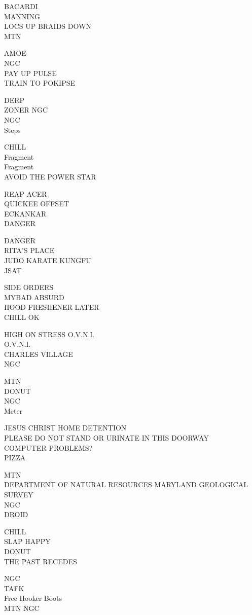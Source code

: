\documentclass[10pt,letterpaper]{article}
\begin{document}
BACARDI\\
MANNING\\
LOCS UP BRAIDS DOWN\\
MTN

AMOE\\
NGC\\
PAY UP PULSE\\
TRAIN TO POKIPSE

DERP\\
ZONER NGC\\
NGC\\
Steps

CHILL\\
Fragment\\
Fragment\\
AVOID THE POWER STAR

REAP ACER\\
QUICKEE OFFSET\\
ECKANKAR\\
DANGER

DANGER\\
RITA'S PLACE\\
JUDO KARATE KUNGFU\\
JSAT

SIDE ORDERS\\
MYBAD ABSURD\\
HOOD FRESHENER LATER\\
CHILL OK

HIGH ON STRESS O.V.N.I.\\
O.V.N.I.\\
CHARLES VILLAGE\\
NGC

MTN\\
DONUT\\
NGC\\
Meter

JESUS CHRIST HOME DETENTION\\
PLEASE DO NOT STAND OR URINATE IN THIS DOORWAY\\
COMPUTER PROBLEMS?\\
PIZZA

MTN\\
DEPARTMENT OF NATURAL RESOURCES MARYLAND GEOLOGICAL SURVEY\\
NGC\\
DROID

CHILL\\
SLAP HAPPY\\
DONUT\\
THE PAST RECEDES

NGC\\
TAFK\\
Free Hooker Boots\\
MTN NGC
\end{document}
